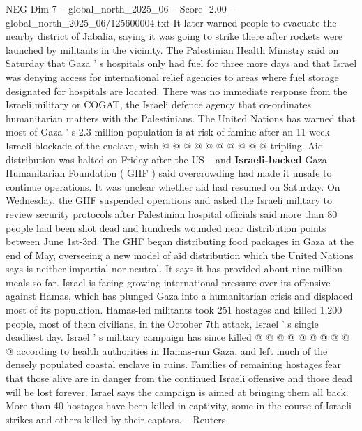 \begin{textsample}{NEG Dim 7 – global\_north\_2025\_06 – Score -2.00 – global\_north\_2025\_06/125600004.txt}
It later warned people to evacuate the nearby district of Jabalia, saying it was going to strike there after rockets were launched by militants in the vicinity.
The Palestinian Health Ministry said on Saturday that Gaza ' s hospitals only had fuel for three more days and that Israel was denying access for international relief agencies to areas where fuel storage designated for hospitals are located.
There was no immediate response from the Israeli military or COGAT, the Israeli defence agency that co-ordinates humanitarian matters with the Palestinians.
The United Nations has warned that most of Gaza ' s 2.3 million population is at risk of famine after an 11-week Israeli blockade of the enclave, with @ @ @ @ @ @ @ @ @ @ tripling.
Aid distribution was halted on Friday after the US -- and \textbf{Israeli-backed} Gaza Humanitarian Foundation ( GHF ) said overcrowding had made it unsafe to continue operations.
It was unclear whether aid had resumed on Saturday.
On Wednesday, the GHF suspended operations and asked the Israeli military to review security protocols after Palestinian hospital officials said more than 80 people had been shot dead and hundreds wounded near distribution points between June 1st-3rd.
The GHF began distributing food packages in Gaza at the end of May, overseeing a new model of aid distribution which the United Nations says is neither impartial nor neutral.
It says it has provided about nine million meals so far.
Israel is facing growing international pressure over its offensive against Hamas, which has plunged Gaza into a humanitarian crisis and displaced most of its population.
Hamas-led militants took 251 hostages and killed 1,200 people, most of them civilians, in the October 7th attack, Israel ' s single deadliest day.
Israel ' s military campaign has since killed @ @ @ @ @ @ @ @ @ @ according to health authorities in Hamas-run Gaza, and left much of the densely populated coastal enclave in ruins.
Families of remaining hostages fear that those alive are in danger from the continued Israeli offensive and those dead will be lost forever.
Israel says the campaign is aimed at bringing them all back.
More than 40 hostages have been killed in captivity, some in the course of Israeli strikes and others killed by their captors. -- Reuters

\end{textsample}
